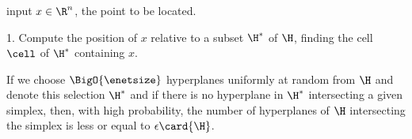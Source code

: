 \begin{frame}\frametitle{\insertsection}\justifying
\begin{algo}
\item[input] $x \in \R^n$, the point to be located.
\item[1.] Compute the position of \(x\) relative to a subset \(\H^{*}\) of \(\H\), finding the cell $\cell$ of \(\H^{*}\) containing $x$.
\end{algo}\pause
\begin{thm}
If we choose $\BigO{\enetsize}$ hyperplanes uniformly at
random from \(\H\) and denote this selection $\H^{*}$ and
if there is no hyperplane in $\H^{*}$ intersecting a given simplex, then, with
high probability, the number of hyperplanes of $\H$ intersecting the simplex
is less or equal to $\epsilon \card{\H}$.
\end{thm}
\end{frame}
